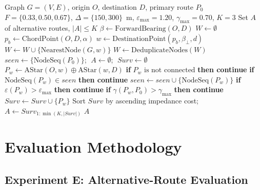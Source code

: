 \documentclass[11pt,conference]{IEEEtran}
\begin{document}
\begin{algorithm}[t]
\small
\caption{Perpendicular-Offset Alternative Route Generation}
\label{alg:offset}
\begin{algorithmic}[1]
\Require Graph $G=(V,E)$, origin $O$, destination $D$, primary route $P_0$
\Require $F=\{0.33,0.50,0.67\}$, $\Delta=\{150,300\}$~m, $\varepsilon_{\max}=1.20$, $\gamma_{\max}=0.70$, $K=3$
\Ensure Set $A$ of alternative routes, $|A|\le K$
\State $\beta \leftarrow \text{ForwardBearing}(O, D)$ 
\State $W \leftarrow \emptyset$
  \State $p_b \leftarrow \text{ChordPoint}(O, D, \alpha)$ 
      \State $w \leftarrow \text{DestinationPoint}(p_b, \beta_\perp, d)$ 
      \State $W \leftarrow W \cup \{\text{NearestNode}(G, w)\}$
    \EndFor
  \EndFor
\EndFor
\State $W \leftarrow \text{DeduplicateNodes}(W)$
\State $\mathit{seen} \leftarrow \{\text{NodeSeq}(P_0)\}$; $\;A \leftarrow \emptyset$; $\;\mathit{Surv} \leftarrow \emptyset$
  \State $P_w \leftarrow \text{AStar}(O,w) \oplus \text{AStar}(w,D)$
  \State \textbf{if} $P_w \text{ is not connected}$ \textbf{then continue}
  \State \textbf{if} $\text{NodeSeq}(P_w) \in \mathit{seen}$ \textbf{then continue}
  \State $\mathit{seen} \leftarrow \mathit{seen} \cup \{\text{NodeSeq}(P_w)\}$
  \State \textbf{if} $\varepsilon(P_w) > \varepsilon_{\max}$ \textbf{then continue} 
  \State \textbf{if} $\gamma(P_w, P_0) > \gamma_{\max}$ \textbf{then continue} 
  \State $\mathit{Surv} \leftarrow \mathit{Surv} \cup \{P_w\}$
\EndFor
\State Sort $\mathit{Surv}$ by ascending impedance cost; $A \leftarrow \mathit{Surv}_{1:\min(K,|\mathit{Surv}|)}$
\State \Return $A$
\end{algorithmic}
\end{algorithm}


\section{Evaluation Methodology}

\subsection{Experiment E: Alternative-Route Evaluation}
\label{sec:methE}
\end{document}
